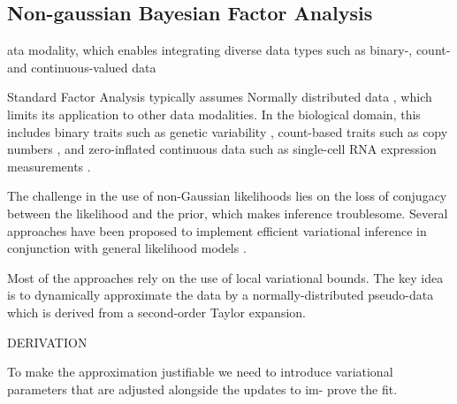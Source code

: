 



\subsection{Non-gaussian Bayesian Factor Analysis}

ata modality, which enables integrating diverse data types such as binary-, count- and continuous-valued data

Standard Factor Analysis typically assumes Normally distributed data \cite{XX}, which limits its application to other data modalities. In the biological domain, this includes binary traits such as genetic variability \cite{}, count-based traits such as copy numbers \cite{}, and zero-inflated continuous data such as single-cell RNA expression measurements \cite{}.

The challenge in the use of non-Gaussian likelihoods lies on the loss of conjugacy between the likelihood and the prior, which makes inference troublesome. Several approaches have been proposed to implement efficient variational inference in conjunction with general likelihood models \cite{XX,XX,XX}.

Most of the approaches rely on the use of local variational bounds. The key idea is to dynamically approximate the data by a normally-distributed pseudo-data which is derived from a second-order Taylor expansion. 

	DERIVATION


To make the approximation justifiable we need to introduce variational parameters that are adjusted alongside the updates to im- prove the fit.
